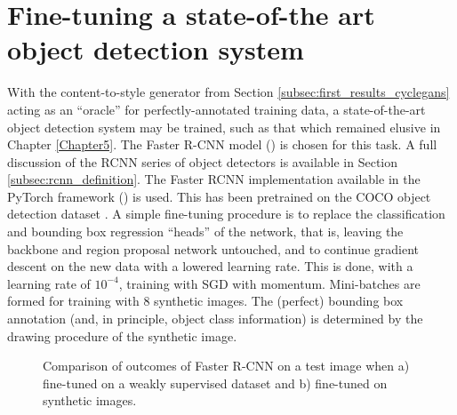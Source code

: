 \section{Fine-tuning a state-of-the art object detection system}
\label{sec:fine_tuning_rcnn}

With the content-to-style generator from Section \ref{subsec:first_results_cyclegans} acting as an ``oracle'' for perfectly-annotated training data, a state-of-the-art object detection system may be trained, such as that which remained elusive in Chapter \ref{Chapter5}. The Faster R-CNN model (\cite{girshick2015fast}) is chosen for this task. A full discussion of the RCNN series of object detectors is available in Section \ref{subsec:rcnn_definition}. The Faster RCNN implementation available in the PyTorch framework (\cite{paszke2017automatic}) is used. This has been pretrained on the COCO object detection dataset \cite{lin2014microsoft}. A simple fine-tuning procedure is to replace the classification and bounding box regression ``heads'' of the network, that is, leaving the backbone and region proposal network untouched, and to continue gradient descent on the new data with a lowered learning rate. This is done, with a learning rate of $10^{-4}$, training with SGD with momentum. Mini-batches are formed for training with $8$ synthetic images. The (perfect) bounding box annotation (and, in principle, object class information) is determined by the drawing procedure of the synthetic image.

\begin{figure}[h]%
    \centering
    \qquad
    \caption{Comparison of outcomes of Faster R-CNN on a test image when a) fine-tuned on a weakly supervised dataset and b) fine-tuned on synthetic images.}%
    \label{fig:faster_rcnn}%
\end{figure}

